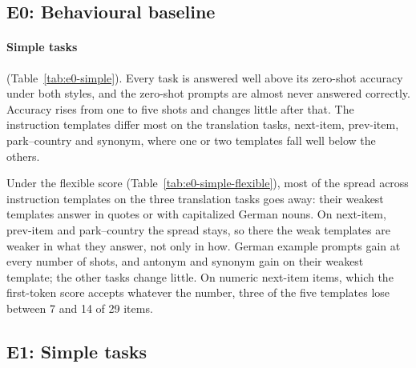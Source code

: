 \documentclass[11pt,a4paper]{article}
\begin{document}
\subsection{E0: Behavioural baseline}\label{sec:res-e0-simple}
\paragraph{Simple tasks} (Table~\ref{tab:e0-simple}). Every task is answered well above its zero-shot accuracy under both styles, and the zero-shot prompts are almost never answered correctly. Accuracy rises from one to five shots and changes little after that. The instruction templates differ most on the translation tasks, next-item, prev-item, park--country and synonym, where one or two templates fall well below the others.

Under the flexible score (Table~\ref{tab:e0-simple-flexible}), most of the spread across instruction templates on the three translation tasks goes away: their weakest templates answer in quotes or with capitalized German nouns. On next-item, prev-item and park--country the spread stays, so there the weak templates are weaker in what they answer, not only in how. German example prompts gain at every number of shots, and antonym and synonym gain on their weakest template; the other tasks change little. On numeric next-item items, which the first-token score accepts whatever the number, three of the five templates lose between 7 and 14 of 29 items.

\begin{table}[tbp]
\centering\footnotesize

\caption{E0, simple tasks: strict accuracy per prompt style. Rule: the five instruction templates of \citet{yang2026shared}, mean and range; example: by number of shots; zero-shot: the prompts without task information. Items: dataset size.}
\label{tab:e0-simple}
\end{table}

\begin{table}[tbp]
\centering\footnotesize

\caption{E0, simple tasks: flexible accuracy per prompt style (Sec.~\ref{sec:evaluation}), on the same saved replies and with the same layout as Table~\ref{tab:e0-simple}.}
\label{tab:e0-simple-flexible}
\end{table}

\subsection{E1: Simple tasks}\label{sec:res-e1}
\end{document}
